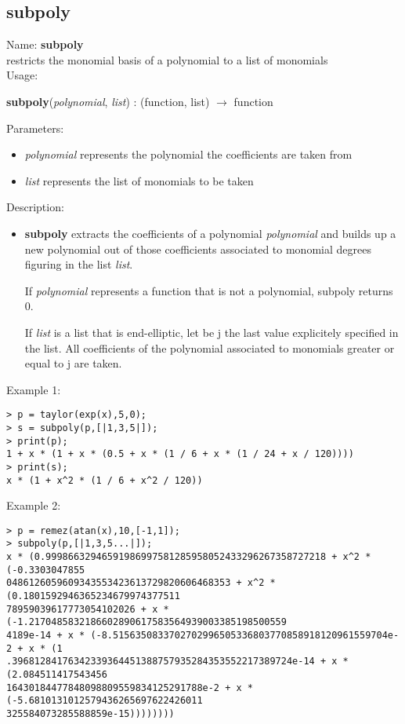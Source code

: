 \subsection{subpoly}
\label{labsubpoly}
\noindent Name: \textbf{subpoly}\\
restricts the monomial basis of a polynomial to a list of monomials\\

\noindent Usage: 
\begin{center}
\textbf{subpoly}(\emph{polynomial}, \emph{list}) : (\textsf{function}, \textsf{list}) $\rightarrow$ \textsf{function}\\
\end{center}
Parameters: 
\begin{itemize}
\item \emph{polynomial} represents the polynomial the coefficients are taken from
\item \emph{list} represents the list of monomials to be taken
\end{itemize}
\noindent Description: \begin{itemize}

\item \textbf{subpoly} extracts the coefficients of a polynomial \emph{polynomial} and builds up a
   new polynomial out of those coefficients associated to monomial degrees figuring in
   the list \emph{list}. 
    
   If \emph{polynomial} represents a function that is not a polynomial, subpoly returns 0.
    
   If \emph{list} is a list that is end-elliptic, let be j the last value explicitely specified
   in the list. All coefficients of the polynomial associated to monomials greater or
   equal to j are taken.
\end{itemize}
\noindent Example 1: 
\begin{center}\begin{minipage}{15cm}\begin{Verbatim}[frame=single]
> p = taylor(exp(x),5,0);
> s = subpoly(p,[|1,3,5|]);
> print(p);
1 + x * (1 + x * (0.5 + x * (1 / 6 + x * (1 / 24 + x / 120))))
> print(s);
x * (1 + x^2 * (1 / 6 + x^2 / 120))
\end{Verbatim}
\end{minipage}\end{center}
\noindent Example 2: 
\begin{center}\begin{minipage}{15cm}\begin{Verbatim}[frame=single]
> p = remez(atan(x),10,[-1,1]);
> subpoly(p,[|1,3,5...|]);
x * (0.99986632946591986997581285958052433296267358727218 + x^2 * (-0.3303047855
0486126059609343553423613729820606468353 + x^2 * (0.1801592946365234679974377511
78959039617773054102026 + x * (-1.2170485832186602890617583564939003385198500559
4189e-14 + x * (-8.5156350833702702996505336803770858918120961559704e-2 + x * (1
.39681284176342339364451388757935284353552217389724e-14 + x * (2.084511417543456
16430184477848098809559834125291788e-2 + x * (-5.6810131012579436265697622426011
325584073285588859e-15))))))))
\end{Verbatim}
\end{minipage}\end{center}
